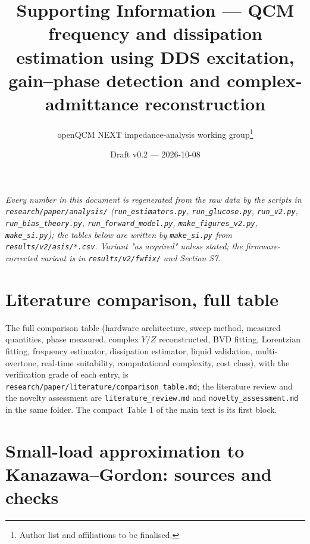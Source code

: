 \documentclass[11pt,a4paper]{article}
\title{Supporting Information --- QCM frequency and dissipation estimation using DDS excitation, gain--phase detection and complex-admittance reconstruction}
\author{openQCM NEXT impedance-analysis working group\thanks{Author list and affiliations to be finalised.}}
\date{Draft v0.2 --- 2026-10-08}
\begin{document}
\maketitle

\noindent\emph{Every number in this document is regenerated from the raw data by the scripts in \texttt{research/paper/analysis/} (\texttt{run\_estimators.py}, \texttt{run\_glucose.py}, \texttt{run\_v2.py}, \texttt{run\_bias\_theory.py}, \texttt{run\_forward\_model.py}, \texttt{make\_figures\_v2.py}, \texttt{make\_si.py}); the tables below are written by \texttt{make\_si.py} from \texttt{results/v2/asis/*.csv}. Variant "as acquired" unless stated; the firmware-corrected variant is in \texttt{results/v2/fwfix/} and Section S7.}

\section{Literature comparison, full table}

The full comparison table (hardware architecture, sweep method, measured quantities, phase measured, complex $Y/Z$ reconstructed, BVD fitting, Lorentzian fitting, frequency estimator, dissipation estimator, liquid validation, multi-overtone, real-time suitability, computational complexity, cost class), with the verification grade of each entry, is \texttt{research/paper/literature/comparison\_table.md}; the literature review and the novelty assessment are \texttt{literature\_review.md} and \texttt{novelty\_assessment.md} in the same folder. The compact Table 1 of the main text is its first block.

\section{Small-load approximation to Kanazawa--Gordon: sources and checks}
\end{document}
